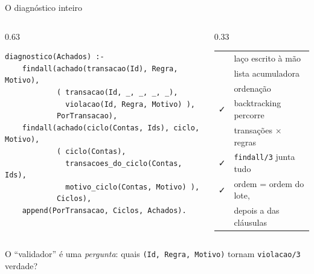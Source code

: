 \documentclass[aspectratio=169,11pt,xcolor=table]{beamer}
\newcommand{\certo}{\textcolor{ok}{\faCheck}}
\newcommand{\errado}{\textcolor{bad}{\faTimes}}
\newcommand{\destaque}[1]{%
  \begin{center}\colorbox{accent!10}{\parbox{0.92\linewidth}{\centering\strut #1\strut}}\end{center}}
\begin{document}
\begin{frame}[fragile]{O diagnóstico inteiro}
  \begin{columns}[T]
    \begin{column}{0.63\textwidth}
\begin{lstlisting}[style=pl, style=pequeno]
diagnostico(Achados) :-
    findall(achado(transacao(Id), Regra, Motivo),
            ( transacao(Id, _, _, _, _),
              violacao(Id, Regra, Motivo) ),
            PorTransacao),
    findall(achado(ciclo(Contas, Ids), ciclo, Motivo),
            ( ciclo(Contas),
              transacoes_do_ciclo(Contas, Ids),
              motivo_ciclo(Contas, Motivo) ),
            Ciclos),
    append(PorTransacao, Ciclos, Achados).
\end{lstlisting}
    \end{column}
    \begin{column}{0.33\textwidth}
      \small
      \begin{tabular}{@{}l l@{}}
        \errado & laço escrito à mão \\[3pt]
        \errado & lista acumuladora \\[3pt]
        \errado & ordenação \\[3pt]
        \certo & backtracking percorre\\ & transações $\times$ regras \\[3pt]
        \certo & \texttt{findall/3} junta tudo \\[3pt]
        \certo & ordem = ordem do lote,\\ & depois a das cláusulas
      \end{tabular}
    \end{column}
  \end{columns}
  \vspace{8pt}
  \destaque{\small O ``validador'' é uma \emph{pergunta}: quais \texttt{(Id, Regra,
  Motivo)} tornam \texttt{violacao/3} verdade?}
\end{frame}
\end{document}

